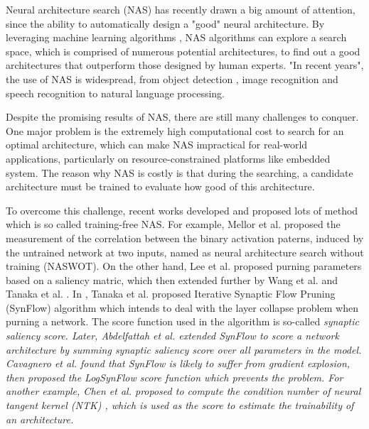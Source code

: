 \documentclass[sigconf]{acmart}
\begin{document}
    Neural architecture search (NAS) has recently drawn a big amount of 
    attention, since the ability to automatically design a "good" neural 
    architecture. By leveraging machine learning algorithms \cite{https://doi.org/10.48550/arxiv.1611.01578}, 
    NAS algorithms can explore a search space, which is comprised of numerous 
    potential architectures, to find out a good architectures that outperform 
    those designed by human experts. "In recent years", the use of NAS is 
    widespread, from object detection \cite{https://doi.org/10.48550/arxiv.2111.13336}, 
    image recognition \cite{https://doi.org/10.48550/arxiv.2006.04647} 
    and speech recognition \cite{https://doi.org/10.48550/arxiv.2011.05649} 
    \cite{mehrotra2021nasbenchasr} to natural language 
    processing. \cite{jiang-etal-2019-improved} 
    \cite{https://doi.org/10.48550/arxiv.2006.07116} 
    \cite{https://doi.org/10.48550/arxiv.2005.14187} 

    Despite the promising results of NAS, there are still many challenges 
    to conquer. One major problem is the extremely high computational 
    cost to search for an optimal architecture, which can make NAS impractical 
    for real-world applications, particularly on resource-constrained 
    platforms like embedded system. The reason why NAS is costly is that 
    during the searching, a candidate architecture must be trained to 
    evaluate how good of this architecture. 

    To overcome this challenge, recent works developed and proposed lots 
    of method which is so called training-free NAS. 
    For example, Mellor et al. \cite{https://doi.org/10.48550/arxiv.2006.04647} proposed the 
    measurement of the correlation between the binary activation paterns, 
    induced by the untrained network at two inputs, named as neural architecture 
    search without training (NASWOT). 
    On the other hand, Lee et al. \cite{lee2019snip} proposed purning parameters based on a saliency matric, 
    which then extended further by Wang et al. \cite{wang2020picking} and Tanaka et al. \cite{tanaka2020pruning}. 
    In \cite{tanaka2020pruning}, Tanaka et al. proposed Iterative Synaptic Flow Pruning 
    (SynFlow) algorithm which intends to deal with the layer collapse problem when purning a network. 
    The score function used in the algorithm is so-called \it{synaptic saliency} \rm{score}. 
    Later, Abdelfattah et al. \cite{abdelfattah2021zerocost} extended SynFlow to score 
    a network architecture by summing synaptic saliency score over all parameters in the model. 
    Cavagnero et al. \cite{Cavagnero_2023} found that SynFlow is likely to suffer from gradient explosion, then 
    proposed the LogSynFlow score function which prevents the problem. 
    For another example, Chen et al. proposed to compute the condition 
    number of neural tangent kernel (NTK) \cite{https://doi.org/10.48550/arxiv.2102.11535} 
    \cite{https://doi.org/10.48550/arxiv.2203.09137} \cite{https://doi.org/10.48550/arxiv.2109.00817}, 
    which is used as the score to estimate the trainability of an architecture. 
\end{document}
